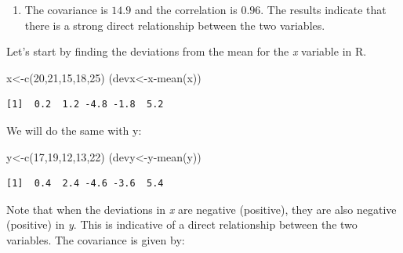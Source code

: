\documentclass[
  letterpaper,
  DIV=11,
  numbers=noendperiod]{scrreprt}
\newenvironment{Shaded}{\begin{snugshade}}{\end{snugshade}}
\newcommand{\DecValTok}[1]{\textcolor[rgb]{0.68,0.00,0.00}{#1}}
\newcommand{\FunctionTok}[1]{\textcolor[rgb]{0.28,0.35,0.67}{#1}}
\newcommand{\NormalTok}[1]{\textcolor[rgb]{0.00,0.23,0.31}{#1}}
\newcommand{\OtherTok}[1]{\textcolor[rgb]{0.00,0.23,0.31}{#1}}
\newcommand{\SpecialCharTok}[1]{\textcolor[rgb]{0.37,0.37,0.37}{#1}}
\providecommand{\tightlist}{%
  \setlength{\itemsep}{0pt}\setlength{\parskip}{0pt}}\usepackage{longtable,booktabs,array}
\begin{document}
\begin{blackbox}

\begin{enumerate}
\def\labelenumi{\arabic{enumi}.}
\tightlist
\item
  The covariance is \(14.9\) and the correlation is \(0.96\). The
  results indicate that there is a strong direct relationship between
  the two variables.
\end{enumerate}

\end{blackbox}

Let's start by finding the deviations from the mean for the \emph{x}
variable in R.

\begin{Shaded}
\begin{Highlighting}[numbers=left,,]
\NormalTok{x}\OtherTok{\textless{}{-}}\FunctionTok{c}\NormalTok{(}\DecValTok{20}\NormalTok{,}\DecValTok{21}\NormalTok{,}\DecValTok{15}\NormalTok{,}\DecValTok{18}\NormalTok{,}\DecValTok{25}\NormalTok{)}
\NormalTok{(devx}\OtherTok{\textless{}{-}}\NormalTok{x}\SpecialCharTok{{-}}\FunctionTok{mean}\NormalTok{(x))}
\end{Highlighting}
\end{Shaded}

\begin{verbatim}
[1]  0.2  1.2 -4.8 -1.8  5.2
\end{verbatim}

We will do the same with y:

\begin{Shaded}
\begin{Highlighting}[numbers=left,,]
\NormalTok{y}\OtherTok{\textless{}{-}}\FunctionTok{c}\NormalTok{(}\DecValTok{17}\NormalTok{,}\DecValTok{19}\NormalTok{,}\DecValTok{12}\NormalTok{,}\DecValTok{13}\NormalTok{,}\DecValTok{22}\NormalTok{)}
\NormalTok{(devy}\OtherTok{\textless{}{-}}\NormalTok{y}\SpecialCharTok{{-}}\FunctionTok{mean}\NormalTok{(y))}
\end{Highlighting}
\end{Shaded}

\begin{verbatim}
[1]  0.4  2.4 -4.6 -3.6  5.4
\end{verbatim}

Note that when the deviations in \emph{x} are negative (positive), they
are also negative (positive) in \emph{y}. This is indicative of a direct
relationship between the two variables. The covariance is given by:
\end{document}
